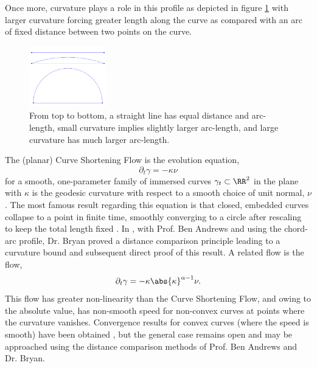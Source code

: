 \documentclass[12pt]{amsart}
\begin{document}
Once more, curvature plays a role in this profile as depicted in figure \ref{fg:chord_arc} with larger curvature forcing greater length along the curve as compared with an arc of fixed distance between two points on the curve.

\begin{figure}[htb]
\centering
\includegraphics[width=0.3\textwidth]{img/chord_arc.png}
\caption{\label{fg:chord_arc}From top to bottom, a straight line has equal distance and arc-length, small curvature implies slightly larger arc-length, and large curvature has much larger arc-length.}
\end{figure}

The (planar) Curve Shortening Flow is the evolution equation,
\[
\partial_t \gamma = - \kappa\nu
\]
for a smooth, one-parameter family of immersed curves $\gamma_t \subset \RR^2$ in the plane with $\kappa$ is the geodesic curvature with respect to a smooth choice of unit normal, $\nu$. The most famous result regarding this equation is that closed, embedded curves collapse to a point in finite time, smoothly converging to a circle after rescaling to keep the total length fixed \cite{MR840401,MR906392}. In \cite{MR2794630}, with Prof. Ben Andrews and using the chord-arc profile, Dr. Bryan proved a distance comparison principle leading to a curvature bound and subsequent direct proof of this result. A related flow is the flow,
\[
\partial_t \gamma = -\kappa\abs{\kappa}^{\alpha-1} \nu.
\]
This flow has greater non-linearity than the Curve Shortening Flow, and owing to the absolute value, has non-smooth speed for non-convex curves at points where the curvature vanishes. Convergence results for convex curves (where the speed is smooth) have been obtained \cite{MR1660843}, but the general case remains open and may be approached using the distance comparison methods of Prof. Ben Andrews and Dr. Bryan.
\end{document}
